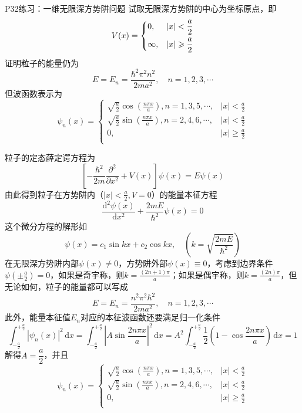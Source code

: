 \begin{question}{P32练习：一维无限深方势阱问题}
    试取无限深方势阱的中心为坐标原点，即
    $$
        V(x) = \begin{dcases}
            0,      & |x|<\frac{a}{2}          \\
            \infty, & |x|\geqslant \frac{a}{2} \\
        \end{dcases}
    $$
    证明粒子的能量仍为
    $$
        E = E_n = \frac{\hbar^2\pi^2n^2}{2ma^2}, \quad n=1,2,3,\cdots
    $$
    但波函数表示为
    $$
        \psi_n(x) = \begin{cases}
            \sqrt{\frac{a}{2}}\cos\left(\frac{n\pi x}{a}\right), n=1,3,5,\cdots, & |x|<\frac{a}{2}         \\
            \sqrt{\frac{a}{2}}\sin\left(\frac{n\pi x}{a}\right), n=2,4,6,\cdots, & |x|<\frac{a}{2}         \\
            0,                                                                   & |x|\geqslant\frac{a}{2} \\
        \end{cases}
    $$
\end{question}
\begin{solution}
    粒子的定态薛定谔方程为
    $$
        \left[-\frac{\hbar^2}{2m}\frac{\partial^2}{\partial x^2}+V(x)\right]\psi(x) = E\psi(x)
    $$
    由此得到粒子在方势阱内（$|x|<\frac{a}{2}, V=0$）的能量本征方程
    $$
        \frac{\mathrm{d}^2\psi(x)}{\mathrm{d}x^2}+\frac{2mE}{\hbar^2}\psi(x)=0
    $$
    这个微分方程的解形如
    $$
        \psi(x)=c_1\sin{kx}+c_2\cos{kx},
        \quad
        \left(k=\sqrt{\frac{2mE}{\hbar^2}}\right)
    $$
    在无限深方势阱内部$\psi(x)\neq0$，方势阱外部$\psi(x)\equiv0$，考虑到边界条件$\psi\left(\pm\frac{a}{2}\right)=0$，如果是奇宇称，则$k=\frac{(2n+1)\pi}{a}$；如果是偶宇称，则$k=\frac{(2n)\pi}{a}$，但无论如何，粒子的能量都可以写成
    $$
        E=E_n=\frac{n^2\pi^2\hbar^2}{2ma^2}, \quad n=1, 2, 3, \cdots
    $$
    此外，能量本征值$E_n$对应的本征波函数还要满足归一化条件
    $$
        \int_{-\frac{a}{2}}^{+\frac{a}{2}}|\psi_n(x)|^2\,\mathrm{d}x
        = \int_{-\frac{a}{2}}^{+\frac{a}{2}}\left|A\sin\frac{2n\pi x}{a}\right|^2\,\mathrm{d}x
        = A^2\int_{-\frac{a}{2}}^{+\frac{a}{2}}\frac{1}{2}\left(1-\cos\frac{2n\pi x}{a}\right)\,\mathrm{d}x
        = 1
    $$
    解得$A=\dfrac{a}{2}$，并且 %
    $$
        \psi_n(x) = \begin{cases}
            \sqrt{\frac{a}{2}}\cos\left(\frac{n\pi x}{a}\right), n=1,3,5,\cdots, & |x|<\frac{a}{2}         \\
            \sqrt{\frac{a}{2}}\sin\left(\frac{n\pi x}{a}\right), n=2,4,6,\cdots, & |x|<\frac{a}{2}         \\
            0,                                                                   & |x|\geqslant\frac{a}{2} \\
        \end{cases}
    $$
\end{solution}




